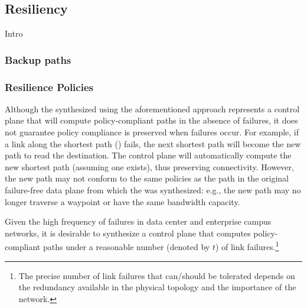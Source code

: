 \subsection{Resiliency}
Intro

\subsubsection{Backup paths}

\subsubsection{Resilience Policies}

Although the \ARC synthesized using the aforementioned approach represents a
control plane that will compute policy-compliant paths in the absence of
failures, it does not guarantee policy compliance is preserved when failures
occur. For example, if a link along the shortest path () fails, the next shortest path will become the new path to
read the destination. The control plane will automatically compute the new
shortest path (assuming one exists), thus preserving connectivity. However,
the new path may not conform to the same policies as the path in the original
failure-free data plane from which the \ARC was synthesized: e.g., the new
path may no longer traverse a waypoint or have the same bandwidth capacity.

Given the high frequency of failures in data center and enterprise campus
networks, it is desirable to synthesize a control plane that computes
policy-compliant paths under a reasonable number (denoted by $t$) of link
failures.\footnote{The precise number of link failures that can/should be
tolerated depends on the redundancy available in the physical topology and the
importance of the network.}  

